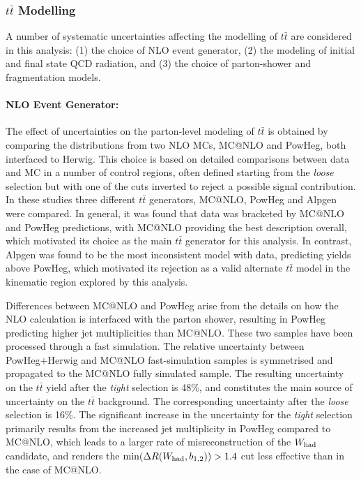 \subsubsection{$t\bar{t}$ Modelling}
\label{sec:systematic_ttbarmodel}
A number of systematic uncertainties affecting the modelling of $t\bar{t}$ are considered
in this analysis: 
(1) the choice of NLO event generator,
(2) the modeling of initial and final state QCD radiation, and
(3) the choice of parton-shower and fragmentation models.

\paragraph{NLO Event Generator:}
The effect of uncertainties on the parton-level modeling of $t\bar{t}$ is obtained by comparing the distributions from two 
NLO MCs, {\sc MC@NLO} and {\sc PowHeg}, both interfaced to {\sc Herwig}.  This choice is based on detailed comparisons
between data and MC in a number of control regions, often defined starting from the {\sl loose} selection but with one of
the cuts inverted to reject a possible signal contribution. In these studies three different $t\bar{t}$ generators, {\sc MC@NLO}, {\sc PowHeg} and
{\sc Alpgen} were compared. In general, it was found that data was bracketed by {\sc MC@NLO} and {\sc PowHeg} predictions,
with {\sc MC@NLO} providing the best description overall, which motivated its choice as the main $t\bar{t}$ generator for this analysis. 
In contrast, {\sc Alpgen} was found to be the most inconsistent model with data, predicting yields above {\sc PowHeg}, which motivated its rejection
as a valid alternate $t\bar{t}$  model in the kinematic region explored by this analysis.

Differences between {\sc MC@NLO} and {\sc PowHeg} arise from 
the details on how the NLO calculation is interfaced with the parton shower, resulting in {\sc PowHeg} predicting higher
jet multiplicities than {\sc MC@NLO}. These two samples have been processed through a fast simulation.
The relative uncertainty between {\sc PowHeg}+{\sc Herwig} and {\sc MC@NLO} fast-simulation samples is symmetrised and propagated to the 
{\sc MC@NLO} fully simulated sample. The resulting uncertainty on the $t\bar{t}$ yield after the {\sl tight} selection is 48\%, and constitutes the
main source of uncertainty on the $t\bar{t}$ background. The corresponding uncertainty after the {\sl loose} selection is 16\%. The significant
increase in the uncertainty for the {\sl tight} selection primarily results from the increased jet multiplicity in {\sc PowHeg} compared to {\sc MC@NLO}, 
which leads to a larger rate of misreconstruction of the $W_{\rm had}$ candidate, and renders the $\min(\Delta R(W_{\rm had}, b_{1,2}))>1.4$ cut less 
effective than in the case of  {\sc MC@NLO}.

